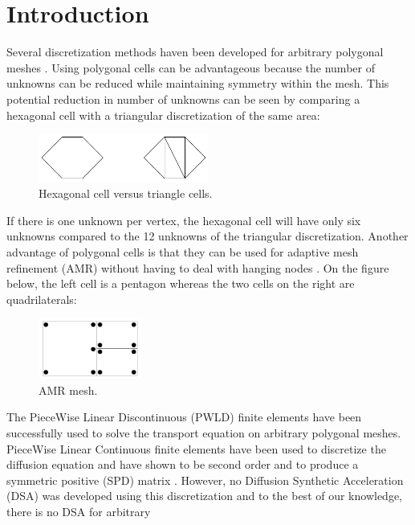 \section{Introduction}
Several discretization methods haven been developed for arbitrary polygonal
meshes \cite{pwld_2d,pwld_3d,pwl_diffusion,palmer_ane,palmer_proc,palmer_fe,
wachspress,cell_centered_diff,mimetic}.  Using polygonal
cells can be advantageous because the number of unknowns can be reduced while
maintaining symmetry within the mesh. This potential reduction in 
number of unknowns can be seen by comparing a hexagonal cell with a triangular
discretization of the same area:
\begin{figure}[H]
\centering
\includegraphics[width=0.5\textwidth]{hex_tri_cells}
\caption{Hexagonal cell versus triangle cells.}
\end{figure}
If there is one unknown per vertex, the hexagonal cell will have only six
unknowns compared to the 12 unknowns of the triangular discretization. Another 
advantage of polygonal cells is that they can be used for adaptive mesh refinement 
(AMR) \cite{amr_rad,amr_block,amr_unstruc} without having to
deal with hanging nodes \cite{arbitrary_hanging_nodes,dealII_hanging_nodes,
locally_hanging_nodes}. On the figure below, the left cell is a pentagon whereas 
the two cells on the right are quadrilaterals:
\begin{figure}[H]
\centering
\includegraphics[width=0.3\textwidth]{amr}
\caption{AMR mesh.}
\end{figure}
The PieceWise Linear Discontinuous (PWLD) finite elements \cite{pwld_2d,pwld_3d} 
have been successfully used to solve the transport equation on arbitrary
polygonal meshes. PieceWise Linear Continuous finite elements have been used to 
discretize the diffusion equation and have shown to be second order and to
produce a symmetric positive (SPD) matrix \cite{pwl_diffusion}. However, no 
Diffusion Synthetic Acceleration (DSA) \cite{dsa_ref} was developed using this 
discretization and to the best of our knowledge, there is no DSA for arbitrary
